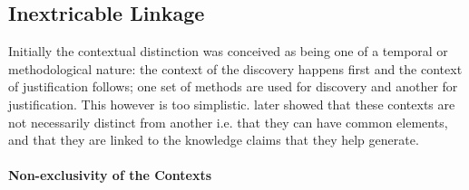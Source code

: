 \documentclass[a4paper]{article}
\begin{document}
\subsection{Inextricable Linkage}

Initially the contextual distinction was conceived as being one of a temporal
or methodological nature: the context of the discovery happens first and the
context of justification follows; one set of methods are used for discovery
and another for justification. This however is too simplistic.
\cite{kuhn1970structure} later showed that these contexts are not necessarily
distinct from another i.e. that they can have common elements, and that they
are linked to the knowledge claims that they help generate. 

\paragraph{Non-exclusivity of the Contexts}
\label{part}
\end{document}
